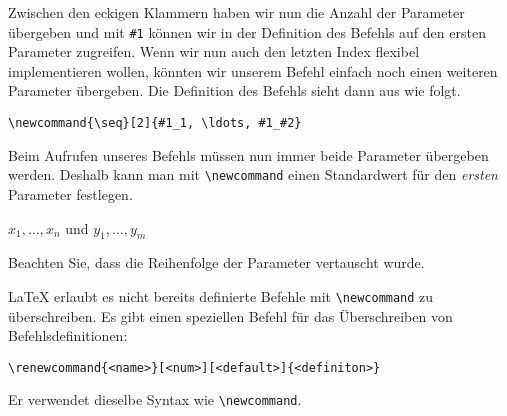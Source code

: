Zwischen den eckigen Klammern haben wir nun die Anzahl der Parameter übergeben und mit \verb|#1| können wir in der Definition des Befehls auf den ersten Parameter zugreifen.
Wenn wir nun auch den letzten Index flexibel implementieren wollen, könnten wir unserem Befehl einfach noch einen weiteren Parameter übergeben.
Die Definition des Befehls sieht dann aus wie folgt.
\begin{lstlisting}
\newcommand{\seq}[2]{#1_1, \ldots, #1_#2}
\end{lstlisting}

Beim Aufrufen unseres Befehls müssen nun immer beide Parameter übergeben werden.
Deshalb kann man mit \verb|\newcommand| einen Standardwert für den \emph{ersten} Parameter festlegen.
\begin{LTXexample}
\newcommand{\seq}[2][n]
        {#2_1, \ldots, #2_#1}

$\seq{x}$ und $\seq[m]{y}$
\end{LTXexample}
Beachten Sie, dass die Reihenfolge der Parameter vertauscht wurde.

\LaTeX{} erlaubt es nicht bereits definierte Befehle mit \verb|\newcommand| zu überschreiben.
Es gibt einen speziellen Befehl für das Überschreiben von Befehlsdefinitionen:
\begin{lstlisting}
\renewcommand{<name>}[<num>][<default>]{<definiton>}
\end{lstlisting}
Er verwendet dieselbe Syntax wie \verb|\newcommand|.
